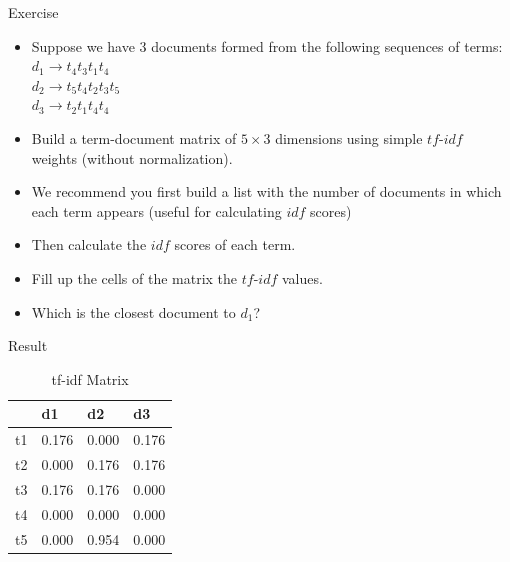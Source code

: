 \documentclass[handout]{beamer}
\begin{document}
\begin{frame}{Exercise}
\begin{itemize}
 \item Suppose we have $3$ documents formed from the following sequences of terms: \\
 $d_{1}\rightarrow t_{4}t_{3}t_{1}t_{4}$ \\
 $d_{2}\rightarrow t_{5}t_{4}t_{2}t_{3}t_{5}$ \\
 $d_{3}\rightarrow t_{2}t_{1}t_{4}t_{4}$ \\

\item Build a term-document matrix of $5\times3$ dimensions using simple $tf$-$idf$ weights (without normalization).
\item  We recommend you first build a list with the number of documents in which each term appears (useful for calculating $idf$ scores) 
\item Then calculate the $idf$ scores of each term.
\item Fill up the cells of the matrix the $tf$-$idf$ values.
\item Which is the closest document to $d_{1}$?
\end{itemize}


\end{frame}

\begin{frame}{Result}
 \begin{table}[htbp]
\caption{tf-idf Matrix}
\begin{tabular}{|l|r|r|r|}
\hline
 & \multicolumn{1}{l|}{d1} & \multicolumn{1}{l|}{d2} & \multicolumn{1}{l|}{d3} \\ \hline
t1 & 0.176 & 0.000 & 0.176 \\ \hline
t2 & 0.000 & 0.176 & 0.176 \\ \hline
t3 & 0.176 & 0.176 & 0.000 \\ \hline
t4 & 0.000 & 0.000 & 0.000 \\ \hline
t5 & 0.000 & 0.954 & 0.000 \\ \hline
\end{tabular}
\end{table}

\end{frame}
\end{document}
